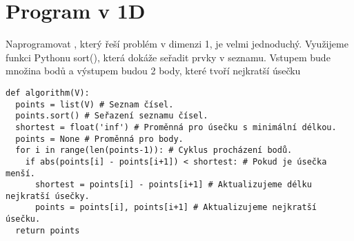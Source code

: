 \section{Program v 1D}
\label{sec:program_1D}
Naprogramovat , který řeší problém v dimenzi 1, je velmi jednoduchý. Využijeme funkci Pythonu sort(), která dokáže seřadit prvky v seznamu. Vstupem bude množina bodů a výstupem budou 2 body, které tvoří nejkratší úsečku

\begin{mdframed}[style=MyFrame]
\begin{lstlisting}[style=metoo]
def algorithm(V):
  points = list(V) # Seznam čísel.
  points.sort() # Seřazení seznamu čísel.
  shortest = float('inf') # Proměnná pro úsečku s minimální délkou.
  points = None # Proměnná pro body.
  for i in range(len(points-1)): # Cyklus procházení bodů.
    if abs(points[i] - points[i+1]) < shortest: # Pokud je úsečka menší.
      shortest = points[i] - points[i+1] # Aktualizujeme délku nejkratší úsečky.
      points = points[i], points[i+1] # Aktualizujeme nejkratší úsečku.
  return points
\end{lstlisting}
\end{mdframed}

